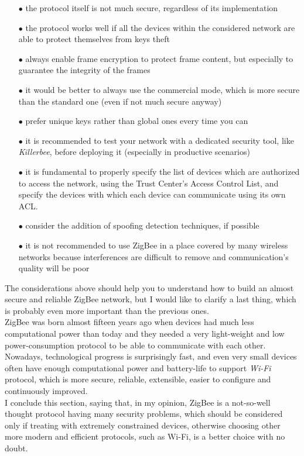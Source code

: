 \documentclass[12pt]{report}
\begin{document}
\begin{itemize}
\setlength{\itemindent}{+4mm}
\item[$\bullet$] the protocol itself is not much secure, regardless of its implementation
\item[$\bullet$] the protocol works well if all the devices within the considered network are able to protect themselves from keys theft
\item[$\bullet$] always enable frame encryption to protect frame content, but especially to guarantee the integrity of the frames
\item[$\bullet$] it would be better to always use the commercial mode, which is more secure than the standard one (even if not much secure anyway)
\item[$\bullet$] prefer unique keys rather than global ones every time you can
\item[$\bullet$] it is recommended to test your network with a dedicated security tool, like \emph{Killerbee}, before deploying it (especially in productive scenarios)
\item[$\bullet$] it is fundamental to properly specify the list of devices which are authorized to access the network, using the Trust Center's Access Control List, and specify the devices with which each device can communicate using its own ACL.
\item[$\bullet$] consider the addition of spoofing detection techniques, if possible
\item[$\bullet$] it is not recommended to use ZigBee in a place covered by many wireless networks because interferences are difficult to remove and communication's quality will be poor\\
\end{itemize}

The considerations above should help you to understand how to build an almost secure and reliable ZigBee network, but I would like to clarify a last thing, which is probably even more important than the previous ones.\\
ZigBee was born almost fifteen years ago when devices had much less computational power than today and they needed a very light-weight and low power-consumption protocol to be able to communicate with each other. Nowadays, technological progress is surprisingly fast, and even very small devices often have enough computational power and battery-life to support \emph{Wi-Fi} protocol, which is more secure, reliable, extensible, easier to configure and continuously improved.\\
I conclude this section, saying that, in my opinion, ZigBee is a not-so-well thought protocol having many security problems, which should be considered only if treating with extremely constrained devices, otherwise choosing other more modern and efficient protocols, such as Wi-Fi, is a better choice with no doubt.\\









%
%
\end{document}
